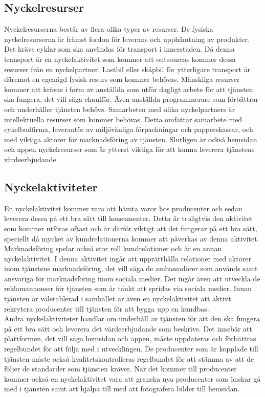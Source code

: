 \documentclass[10pt,a4paper,oneside]{article}
\begin{document}
\subsection{Nyckelresurser}
Nyckelresurserna består av flera olika typer av resurser. De fysiska nyckelresurserna är främst fordon för leverans och upphämtning av produkter. Det krävs cyklar som ska användas för transport i innerstaden. Då denna transport är en nyckelaktivitet som kommer att outsourcas kommer dessa resurser från en nyckelpartner. Lastbil eller skåpbil för ytterligare transport är däremot en egenägd fysisk resurs som kommer behövas. Mänskliga resurser kommer att krävas i form av anställda som utför dagligt arbete för att tjänsten ska fungera, det vill säga chaufför. Även anställda programmerare som förbättrar och underhåller tjänsten behövs. Samarbeten med olika nyckelpartners är intellektuella resurser som kommer behövas. Detta omfattar samarbete med cykelbudfirma, leverantör av miljövänliga förpackningar och papperskassar, och med viktiga aktörer för marknadsföring av tjänsten.  Slutligen är också hemsidan och appen nyckelresurser som är ytterst viktiga för att kunna leverera tjänstens värdeerbjudande. 

\subsection{Nyckelaktiviteter}
En nyckelaktivitet kommer vara att hämta varor hos producenter och sedan leverera dessa på ett bra sätt till konsumenter. Detta är troligtvis den aktivitet som kommer utföras oftast och är därför viktigt att det fungerar på ett bra sätt, speciellt då mycket av kundrelationerna kommer att påverkas av denna aktivitet. Marknadsföring spelar också stor roll kundrelationer och är en annan nyckelaktivitet. I denna aktivitet ingår att upprätthålla relationer med aktörer inom tjänstens marknadsföring, det vill säga de ambassadörer som används samt ansvariga för marknadsföring inom sociala medier. Det ingår även att utveckla de reklamannonser för tjänsten som är tänkt att spridas via sociala medier. Innan tjänsten är väletablerad i samhället är även en nyckelaktivitet att aktivt rekrytera producenter till tjänsten för att bygga upp en kundbas.\\  

Andra nyckelaktiviteter handlar om underhåll av tjänsten för att den ska fungera på ett bra sätt och leverera det värdeerbjudande som beskrivs. Det innebär att plattformen, det vill säga hemsidan och appen, måste uppdateras och förbättras regelbundet för att följa med i utvecklingen. De producenter som är kopplade till tjänsten måste också kvalitetskontrolleras regelbundet för att stämma av att de följer de standarder som tjänsten kräver. När det kommer till producenter kommer också en nyckelaktivitet vara att granska nya producenter som önskar gå med i tjänsten samt att hjälpa till med att fotografera bilder till hemsidan. 
\end{document}
